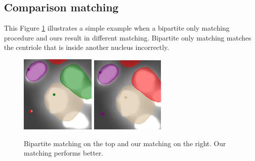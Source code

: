 \documentclass[9pt,conference,compsocconf, article]{IEEEtran}
\begin{document}
\subsection{Comparison matching}
This Figure \ref{fig:app_match_comp} illustrates a simple example when a bipartite only matching procedure and ours result in different matching. Bipartite only matching matches the centriole that is inside another nucleus incorrectly. 
\begin{figure}[h!]
    \centering
        \includegraphics[width=0.35\linewidth]{images/bip_matching.PNG}
        \includegraphics[width=0.35\linewidth]{images/our_matching.PNG}
        
    \caption{
    Bipartite matching on the top and our matching on the right. Our matching performs better.
    }
    \label{fig:app_match_comp}
\end{figure}
\end{document}

